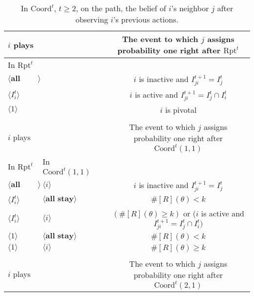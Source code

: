 \documentclass[12pt,letter]{article}
\newcommand{\Kappa}{\mathrm{Coord}}
\newcommand{\Omicron}{\mathrm{Rpt}}
\theoremstyle{definition}
\theoremstyle{remark}
\theoremstyle{claim}
\begin{document}
\begin{table}[!htbp]
\caption{In $\Kappa^t$, $t\geq 2$, on the path, the belief of $i$'s neighbor $j$ after observing $i$'s previous actions.}
\label{Table_blf_cdt}
\begin{center}
\begin{tabular}{l l l | c}
 $i$ plays  	&&	&	 The event to which $j$ assigns probability one right after $\Omicron^t$\\
\hline
\hline
 In $\Omicron^t$		&&&					 \\
\hline
$\langle \textbf{all stay} \rangle$  &&&     $i$ is inactive and $I^{t+1}_{ji}=I^t_j$ \\
$\langle I^t_{i} \rangle$  &&&     $i$ is active and $I^{t+1}_{ji}=I^t_j\cap I^t_{i}$ \\
$\langle 1 \rangle$  &&& 	  $i$ is pivotal    \\
\hline
\\
 $i$ plays	&&			  & The event to which $j$ assigns probability one right after $\Kappa^t(1,1)$\\
\hline
\hline
	  In $\Omicron^t$	 	&		In $\Kappa^t(1,1)$	&		&		  \\
\hline
$\langle \textbf{all stay} \rangle$  & $\langle i \rangle$	&&    $i$ is inactive and $I^{t+1}_{ji}=I^t_j$  \\
$\langle I^t_{i} \rangle$  & $\langle \textbf{all stay} \rangle$	&&    $\#[R](\theta)< k$ \\
$\langle I^t_{i} \rangle$  & $\langle i \rangle$	&&   $(\#[R](\theta)\geq k )$ or  ($i$ is active and $I^{t+1}_{ji}=I^t_j\cap I^t_{i})$\\
$\langle 1 \rangle$  & $\langle \textbf{all stay} \rangle$	&&	  $\#[R](\theta)< k$    \\
$\langle 1 \rangle$  & $\langle i \rangle$	&&	  $\#[R](\theta)\geq k$  \\
\hline
\\
 $i$ plays  	&		&  	  &The event to which $j$ assigns probability one right after $\Kappa^t(2,1)$\\

\end{tabular}
\end{center}
\end{table}
\end{document}
